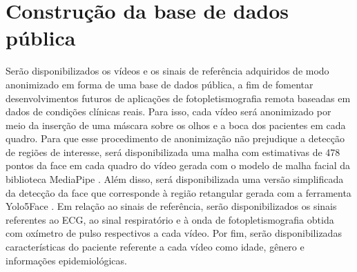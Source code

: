 \section{Construção da base de dados pública}

Serão disponibilizados os vídeos e os sinais de referência adquiridos de modo anonimizado em forma de uma base de dados pública, a fim de fomentar desenvolvimentos futuros de aplicações de fotopletismografia remota baseadas em dados de condições clínicas reais. Para isso, cada vídeo será anonimizado por meio da inserção de uma máscara sobre os olhos e a boca dos pacientes em cada quadro. Para que esse procedimento de anonimização não prejudique a detecção de regiões de interesse, será disponibilizada uma malha com estimativas de 478 pontos da face em cada quadro do vídeo gerada com o modelo de malha facial \cite{kartynnik2019real} da biblioteca MediaPipe \cite{lugaresi2019mediapipe}. Além disso, será disponibilizada uma versão simplificada da detecção da face que corresponde à região retangular gerada com a ferramenta Yolo5Face \cite{qi2022yolo5face}. Em relação ao sinais de referência, serão disponibilizados os sinais referentes ao ECG, ao sinal respiratório e à onda de fotopletismografia obtida com oxímetro de pulso respectivos a cada vídeo. Por fim, serão disponibilizadas características do paciente referente a cada vídeo como idade, gênero e informações epidemiológicas. 